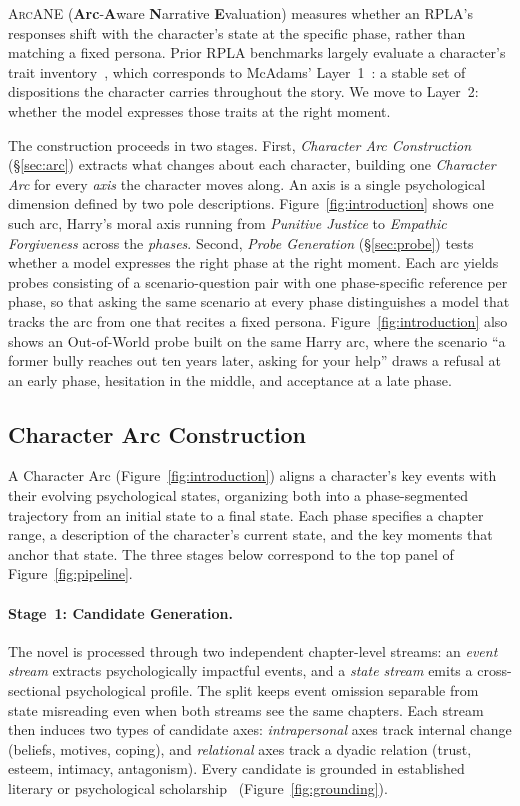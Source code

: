 \documentclass{llmxive}
\providecommand{\ours}{\textsc{ArcANE}}
\begin{document}
\ours{} (\textbf{Arc}-\textbf{A}ware \textbf{N}arrative \textbf{E}valuation) measures whether an RPLA's responses shift with the character's state at the specific phase, rather than matching a fixed persona. Prior RPLA benchmarks largely evaluate a character's trait inventory~\cite{huang2024psychobench, wang-etal-2024-incharacter}, which corresponds to McAdams' Layer~1~\cite{Mcadams1999, Mcadams2013}: a stable set of dispositions the character carries throughout the story. We move to Layer~2: whether the model expresses those traits at the right moment.

The construction proceeds in two stages. First, \emph{Character Arc Construction} (\S\ref{sec:arc}) extracts what changes about each character, building one \emph{Character Arc} for every \emph{axis} the character moves along. An axis is a single psychological dimension defined by two pole descriptions. Figure~\ref{fig:introduction} shows one such arc, Harry's moral axis running from \textit{Punitive Justice} to \textit{Empathic Forgiveness} across the \emph{phases}. Second, \emph{Probe Generation} (\S\ref{sec:probe}) tests whether a model expresses the right phase at the right moment. Each arc yields probes consisting of a scenario-question pair with one phase-specific reference per phase, so that asking the same scenario at every phase distinguishes a model that tracks the arc from one that recites a fixed persona. Figure~\ref{fig:introduction} also shows an Out-of-World probe built on the same Harry arc, where the scenario ``a former bully reaches out ten years later, asking for your help'' draws a refusal at an early phase, hesitation in the middle, and acceptance at a late phase.

\subsection{Character Arc Construction\label{sec:arc}}

A Character Arc (Figure~\ref{fig:introduction}) aligns a character's key events with their evolving psychological states, organizing both into a phase-segmented trajectory from an initial state to a final state. Each phase specifies a chapter range, a description of the character's current state, and the key moments that anchor that state. The three stages below correspond to the top panel of Figure~\ref{fig:pipeline}.

\paragraph{Stage~1: Candidate Generation.}
The novel is processed through two independent chapter-level streams: an \emph{event stream} extracts psychologically impactful events, and a \emph{state stream} emits a cross-sectional psychological profile. The split keeps event omission separable from state misreading even when both streams see the same chapters. Each stream then induces two types of candidate axes: \emph{intrapersonal} axes track internal change (beliefs, motives, coping), and \emph{relational} axes track a dyadic relation (trust, esteem, intimacy, antagonism). Every candidate is grounded in established literary or psychological scholarship~\cite{huang2025values} (Figure~\ref{fig:grounding}).
\end{document}
